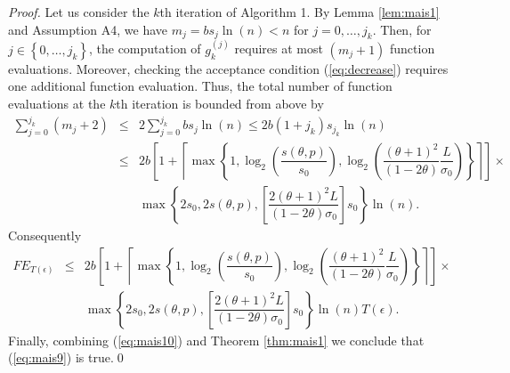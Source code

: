 \begin{proof}
Let us consider the $k$th iteration of Algorithm 1. By Lemma \ref{lem:mais1} and Assumption A4, we have $m_{j}=b s_{j}\ln(n)<n$ for $j=0,\ldots,j_{k}$. Then, for $j\in\left\{0,\ldots,j_{k}\right\}$, the computation of $g_{k}^{(j)}$ requires at most $(m_{j}+1)$ function evaluations. Moreover, checking the acceptance condition (\ref{eq:decrease}) requires one additional function evaluation. Thus, the total number of function evaluations at the $k$th iteration is bounded from above by
\begin{eqnarray*}
\sum_{j=0}^{j_{k}}(m_{j}+2)&\leq &2\sum_{j=0}^{j_{k}}b s_{j}\ln(n)\leq 2b(1+j_{k}) s_{j_{k}}\ln(n)\\
                     &\leq &2b\left[1+\left\lceil\max\left\{1,\log_{2}\left(\dfrac{s(\theta,p)}{s_{0}}\right),\log_{2}\left(\dfrac{(\theta+1)^{2}}{(1-2\theta)}\dfrac{L}{\sigma_{0}}\right)\right\}\right\rceil\right]\times\nonumber\\
& & \max\left\{2s_{0},2s(\theta,p),\left[\dfrac{2(\theta+1)^{2}L}{(1-2\theta)\sigma_{0}}\right]s_{0}\right\}\ln(n).
\end{eqnarray*}
Consequently
\begin{eqnarray}
FE_{T(\epsilon)}&\leq & 2b\left[1+\left\lceil\max\left\{1,\log_{2}\left(\dfrac{ s(\theta,p)}{s_{0}}\right),\log_{2}\left(\dfrac{(\theta+1)^{2}}{(1-2\theta)}\dfrac{L}{\sigma_{0}}\right)\right\}\right\rceil\right]\times\nonumber\\
& & \max\left\{2s_{0},2s(\theta,p),\left[\dfrac{2(\theta+1)^{2}L}{(1-2\theta)\sigma_{0}}\right]s_{0}\right\}\ln(n)T(\epsilon).
\label{eq:mais10}
\end{eqnarray}
\normalsize
Finally, combining (\ref{eq:mais10}) and Theorem \ref{thm:mais1} we conclude that (\ref{eq:mais9}) is true.\qed
\end{proof}


